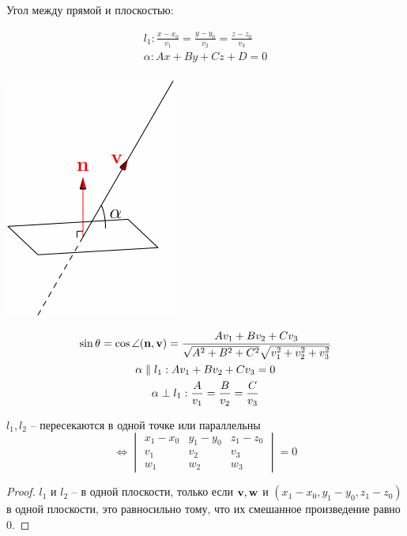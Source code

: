 Угол между прямой и плоскостью: \\
\noindent\begin{minipage}{0.45\textwidth}
    \begin{gather*}
        l_1: \frac{x-x_0}{v_1} = \frac{y-y_0}{v_2} = \frac{z-z_0}{v_3}\\
        \alpha: Ax+By+Cz+D=0\\
    \end{gather*}
\end{minipage}
\begin{minipage}{0.45\textwidth}
    \begin{center}
        \includegraphics{figures/angle_between_line_and_plane.pdf}
    \end{center}
\end{minipage}
\begin{gather*}
    \sin\theta = \cos \angle (\mathbf{n}, \mathbf{v}) = \frac{Av_1 + Bv_2 + Cv_3}
    {\sqrt{A^2+B^2+C^2} \sqrt{v_1^2+v_2^2+v_3^2}}\\
    \alpha \parallel l_1: Av_1 + Bv_2 + Cv_3 = 0\\
    \alpha \perp l_1: \frac{A}{v_1} = \frac{B}{v_2} = \frac{C}{v_3}
\end{gather*}

\begin{theorem}

    $l_1, l_2$ -- пересекаются в одной точке или параллельны
    \[\Leftrightarrow
        \begin{vmatrix}
            x_1 - x_0 & y_1-y_0 & z_1-z_0 \\
            v_1       & v_2     & v_3     \\
            w_1       & w_2     & w_3
        \end{vmatrix} = 0\]
\end{theorem}
\begin{proof}
    $l_1$ и $l_2$ -- в одной плоскости, только если $\mathbf{v}, \mathbf{w}$ и
    $(x_1-x_0, y_1-y_0, z_1-z_0)$ в одной плоскости, это равносильно тому, что
    их смешанное произведение равно 0.
\end{proof}

